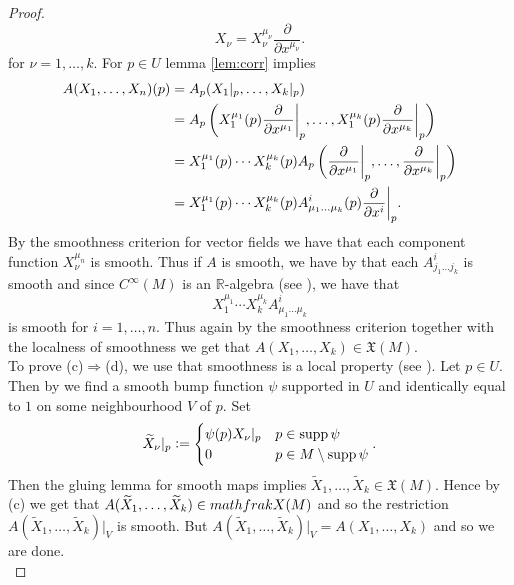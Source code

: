 \begin{proof}
\begin{equation*}
X_\nu = X^{\mu_\nu}_\nu \frac{\partial}{\partial x^{\mu_\nu}}.
\end{equation*}
\noindent for $\nu = 1,\dots,k$. For $p \in U$ lemma \ref{lem:corr} implies
\begin{align*}
A(X_1,\dots,X_n)(p) &= A_p(X_1\vert_p,\dots,X_k\vert_p)\\
&= A_p\del[3]{X^{\mu_1}_1(p) \frac{\partial}{\partial x^{\mu_1}}\bigg\vert_p,\dots,X^{\mu_k}_1(p) \frac{\partial}{\partial x^{\mu_k}}\bigg\vert_p}\\
&= X^{\mu_1}_1(p) \cdots X^{\mu_k}_k(p)A_p\del[3]{\frac{\partial}{\partial x^{\mu_1}}\bigg\vert_p,\dots,\frac{\partial}{\partial x^{\mu_k}}\bigg\vert_p}\\
&= X^{\mu_1}_1(p) \cdots X^{\mu_k}_k(p) A^i_{\mu_1 \dots \mu_k}(p)\frac{\partial}{\partial x^i}\bigg\vert_p.
\end{align*}
By the smoothness criterion for vector fields \cite[175]{lee:smooth_manifolds:2013} we have that each component function $X^{\mu_n}_\nu$ is smooth. Thus if $A$ is smooth, we have by  that each $A^i_{j_1\dots j_k}$ is smooth and since $C^\infty(M)$ is an $\mathbb{R}$-algebra (see \cite[33]{lee:smooth_manifolds:2013}), we have that 
\begin{equation*}
X^{\mu_1}_1 \cdots X^{\mu_k}_k A^i_{\mu_1 \dots \mu_k}
\end{equation*} 
\noindent is smooth for $i = 1,\dots,n$. Thus again by the smoothness criterion together with the localness of smoothness \cite[35]{lee:smooth_manifolds:2013} we get that $A(X_1,\dots,X_k) \in \mathfrak{X}(M)$.\\
To prove (c)$\Rightarrow$(d), we use that smoothness is a local property (see \cite[35]{lee:smooth_manifolds:2013}). Let $p \in U$.  Then by \cite[14]{cattaneo:manifolds:2017} we find a smooth bump function $\psi$ supported in $U$ and identically equal to $1$ on some neighbourhood $V$ of $p$. Set 
\begin{align*}
\widetilde{X}_\nu\vert_p := \begin{cases}
\psi(p) X_\nu\vert_p & p \in \operatorname{supp} \psi\\
0 & p \in M \setminus \operatorname{supp} \psi
\end{cases}.
\end{align*}
Then the gluing lemma for smooth maps \cite[35]{lee:smooth_manifolds:2013} implies $\widetilde{X}_1,\dots,\widetilde{X}_k \in \mathfrak{X}(M)$. Hence by (c) we get that $A(\widetilde{X}_1,\dots,\widetilde{X}_k) \in \\mathfrak{X}(M)$ and so the restriction $A(\widetilde{X}_1,\dots,\widetilde{X}_k)\vert_V$ is smooth. But $A(\widetilde{X}_1,\dots,\widetilde{X}_k)\vert_V = A(X_1,\dots,X_k)$ and so we are done.\\

\end{proof}

